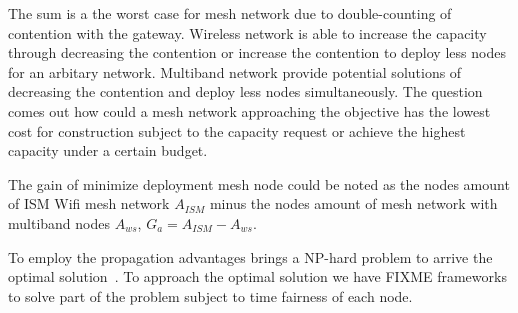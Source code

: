 The sum is a the worst case for mesh network due to double-counting of contention with the gateway.
Wireless network is able to increase the capacity through decreasing the contention or increase the contention to deploy less nodes for an arbitary network. 
Multiband network provide potential solutions of decreasing the contention and deploy less nodes simultaneously. 
The question comes out how could a mesh network approaching the objective has the lowest cost for construction subject to the capacity request or achieve the highest capacity under a certain budget.


The gain of minimize deployment mesh node could be noted as the nodes amount of ISM Wifi mesh network $A_{ISM}$ minus the nodes amount of mesh network with multiband nodes $A_{ws}$, $G_a=A_{ISM}-A_{ws}$.

To employ the propagation advantages brings a NP-hard problem to arrive the optimal solution~\cite{arkoulis2013optimal}. 
To approach the optimal solution we have FIXME frameworks to solve part of the problem subject to time fairness of each node.

